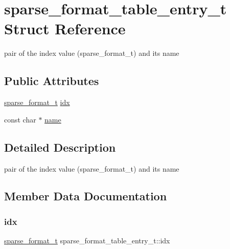 \hypertarget{structsparse__format__table__entry__t}{}\section{sparse\+\_\+format\+\_\+table\+\_\+entry\+\_\+t Struct Reference}
\label{structsparse__format__table__entry__t}


pair of the index value (sparse\+\_\+format\+\_\+t) and its name  


\subsection*{Public Attributes}
\begin{DoxyCompactItemize}
\item 
\hyperlink{spmv_8cc_a8c0094893526c01b430903b2d9227256}{sparse\+\_\+format\+\_\+t} \hyperlink{structsparse__format__table__entry__t_a1869dde0c0a30270a1f6477c01d530db}{idx}
\item 
const char $\ast$ \hyperlink{structsparse__format__table__entry__t_aff9c31fa7933890b2d4cf0f963df2d89}{name}
\end{DoxyCompactItemize}


\subsection{Detailed Description}
pair of the index value (sparse\+\_\+format\+\_\+t) and its name 

\subsection{Member Data Documentation}
\mbox{\label{structsparse__format__table__entry__t_a1869dde0c0a30270a1f6477c01d530db}} 
\subsubsection{\texorpdfstring{idx}{idx}}
{\footnotesize\ttfamily \hyperlink{spmv_8cc_a8c0094893526c01b430903b2d9227256}{sparse\+\_\+format\+\_\+t} sparse\+\_\+format\+\_\+table\+\_\+entry\+\_\+t\+::idx}


